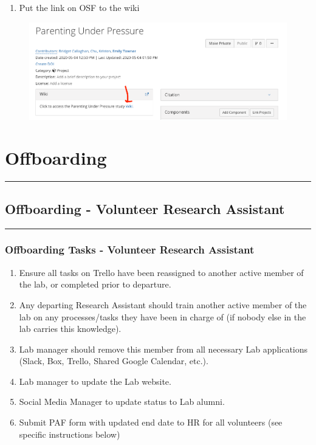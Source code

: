 \documentclass[]{book}
\providecommand{\tightlist}{%
  \setlength{\itemsep}{0pt}\setlength{\parskip}{0pt}}
\begin{document}
\begin{enumerate}
\def\labelenumi{\arabic{enumi}.}
\setcounter{enumi}{6}
\tightlist
\item
  Put the link on OSF to the wiki
\end{enumerate}

\begin{figure}
\centering
\includegraphics{images/research_protocols/wiki/7.png}
\caption{}
\end{figure}

\chapter{Offboarding}\label{offboarding}

\begin{center}\rule{0.5\linewidth}{0.5pt}\end{center}

\section{Offboarding - Volunteer Research
Assistant}\label{offboarding---volunteer-research-assistant}

\begin{center}\rule{0.5\linewidth}{0.5pt}\end{center}

\subsection{Offboarding Tasks - Volunteer Research
Assistant}\label{offboarding-tasks---volunteer-research-assistant}

\begin{enumerate}
\def\labelenumi{\arabic{enumi}.}
\tightlist
\item
  Ensure all tasks on Trello have been reassigned to another active
  member of the lab, or completed prior to departure.
\item
  Any departing Research Assistant should train another active member of
  the lab on any processes/tasks they have been in charge of (if nobody
  else in the lab carries this knowledge).
\item
  Lab manager should remove this member from all necessary Lab
  applications (Slack, Box, Trello, Shared Google Calendar, etc.).
\item
  Lab manager to update the Lab website.
\item
  Social Media Manager to update status to Lab alumni.
\item
  Submit PAF form with updated end date to HR for all volunteers (see
  specific instructions below)
\end{enumerate}
\end{document}
